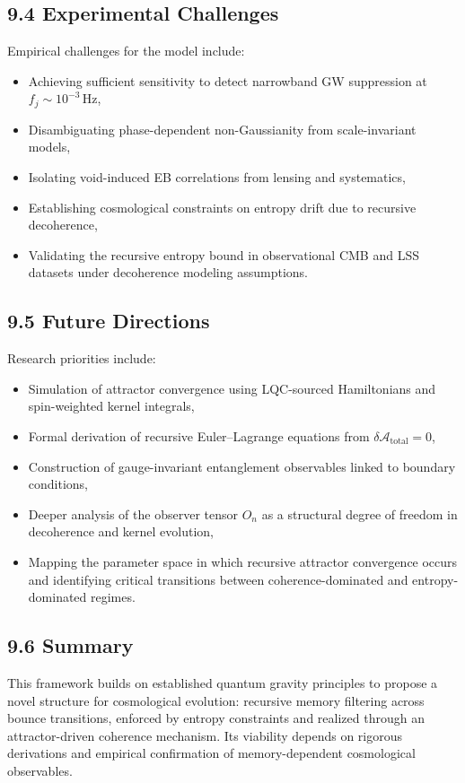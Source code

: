 \subsection{9.4 Experimental Challenges}

Empirical challenges for the model include:
\begin{itemize}
    \item Achieving sufficient sensitivity to detect narrowband GW suppression at \( f_j \sim 10^{-3} \,\text{Hz} \),
    \item Disambiguating phase-dependent non-Gaussianity from scale-invariant models,
    \item Isolating void-induced EB correlations from lensing and systematics,
    \item Establishing cosmological constraints on entropy drift due to recursive decoherence,
    \item Validating the recursive entropy bound in observational CMB and LSS datasets under decoherence modeling assumptions.
\end{itemize}

\subsection{9.5 Future Directions}

Research priorities include:
\begin{itemize}
    \item Simulation of attractor convergence using LQC-sourced Hamiltonians and spin-weighted kernel integrals,
    \item Formal derivation of recursive Euler–Lagrange equations from \( \delta \mathcal{A}_{\text{total}} = 0 \),
    \item Construction of gauge-invariant entanglement observables linked to boundary conditions,
    \item Deeper analysis of the observer tensor \( O_n \) as a structural degree of freedom in decoherence and kernel evolution,
    \item Mapping the parameter space in which recursive attractor convergence occurs and identifying critical transitions between coherence-dominated and entropy-dominated regimes.
\end{itemize}

\subsection{9.6 Summary}

This framework builds on established quantum gravity principles to propose a novel structure for cosmological evolution: recursive memory filtering across bounce transitions, enforced by entropy constraints and realized through an attractor-driven coherence mechanism. Its viability depends on rigorous derivations and empirical confirmation of memory-dependent cosmological observables.
